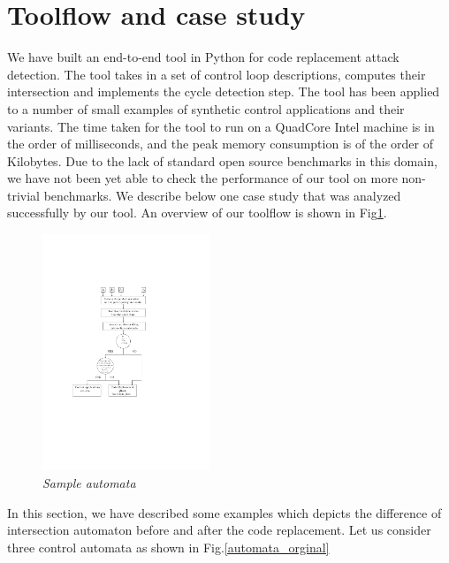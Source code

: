 \section{Toolflow and case study} \label{sec5}
\noindent
We have built an end-to-end tool in Python for code replacement attack detection.
The tool takes in a set of control loop descriptions, computes their intersection and 
implements the cycle detection step. The tool has been applied to a number of small 
examples of synthetic control applications and their variants. The time taken for
the tool to run on a QuadCore Intel machine is in the order of milliseconds, and the
peak memory consumption is of the order of Kilobytes. Due to the lack of standard open
source benchmarks in this domain, we have not been yet able to check the performance of
our tool on more non-trivial benchmarks. We describe below one case study that was analyzed 
successfully by our tool. An overview of our toolflow is shown in Fig\ref{tool_algorithm}.

\begin{figure}
\begin{center}
\includegraphics[width=50mm]{algorithm.pdf}
\end{center}
\caption{{\em Sample automata}}
\label{tool_algorithm}
\end{figure}


In this section, we have described some examples which depicts the difference of intersection
automaton before and after the code replacement. 
Let us consider three control automata as shown in Fig.\ref{automata_orginal}

